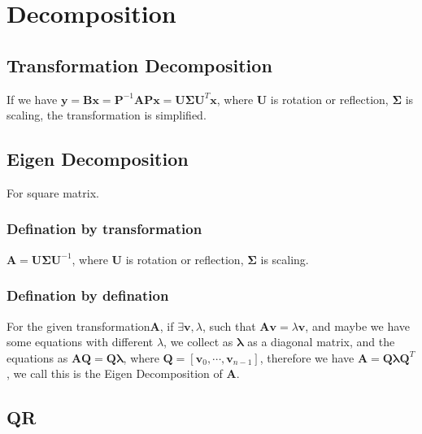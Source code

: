 \documentclass[UTF8]{../../09-Mathematics}
\begin{document}
\chapter{Decomposition}

\section{Transformation Decomposition}

If we have 
$\boldsymbol y = \boldsymbol B \boldsymbol x= \boldsymbol P^{-1} \boldsymbol A \boldsymbol P \boldsymbol x = \boldsymbol U \boldsymbol \Sigma  \boldsymbol U^T \boldsymbol x$, where $ \boldsymbol U $ is rotation or reflection, $ \boldsymbol \Sigma  $ is scaling, the transformation is simplified.





\section{Eigen Decomposition}

For square matrix.
 
\subsection{Defination by transformation}
  $\boldsymbol A =\boldsymbol U \boldsymbol \Sigma  \boldsymbol U^{-1} $, where $ \boldsymbol U $ is rotation or reflection, $ \boldsymbol \Sigma  $ is scaling.
 
 
\subsection{Defination by defination}
 
For the given transformation$\boldsymbol A $, if $\exists \boldsymbol v, \lambda$, such that $\boldsymbol A \boldsymbol v = \lambda \boldsymbol v$, and maybe we have some equations with different $\lambda$, we collect as $\boldsymbol  \lambda$ as a diagonal matrix, and the equations as  $\boldsymbol A \boldsymbol Q =  \boldsymbol Q\boldsymbol \lambda$, where $\boldsymbol Q = [\boldsymbol  v_0, \cdots, \boldsymbol  v_{n-1}]$, therefore we have  $\boldsymbol A =  \boldsymbol Q\boldsymbol \lambda\boldsymbol Q ^T$, we call this is the Eigen Decomposition of $\boldsymbol  A$.
 
 


\section{QR}
\end{document}

